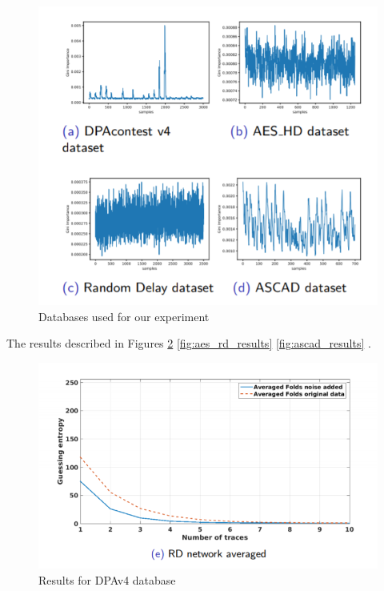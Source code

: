 \begin{figure}
    \centering
    \includegraphics[scale=0.5]{images/chapter8/dbs_cna.PNG}
    \caption{Databases used for our experiment}
    \label{fig:dbs_cna}
\end{figure}

The results described in Figures \ref{fig:dpav4_results} \ref{fig:aes_rd_results} \ref{fig:ascad_results} .

\begin{figure}
    \centering
    \includegraphics[scale=0.5]{images/chapter8/dpav4.PNG}
    \caption{Results for DPAv4 database}
    \label{fig:dpav4_results}
\end{figure}


